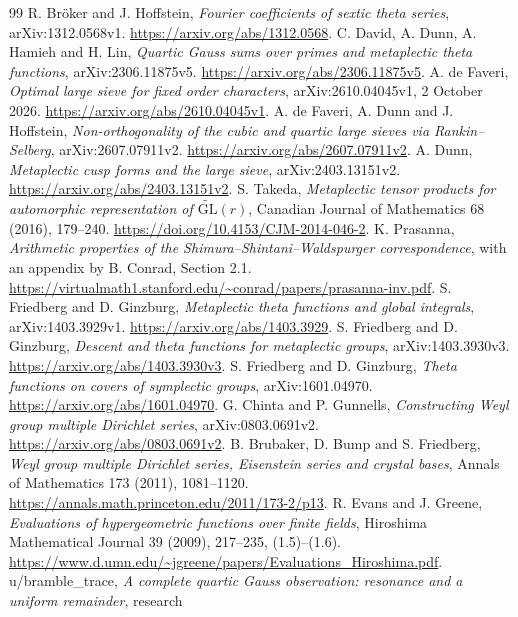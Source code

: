 \documentclass[11pt]{article}
\begin{document}
\begin{thebibliography}{99}
 R. Br\"oker and J. Hoffstein,
\emph{Fourier coefficients of sextic theta series}, arXiv:1312.0568v1.
\url{https://arxiv.org/abs/1312.0568}.
 C. David, A. Dunn, A. Hamieh and H. Lin,
\emph{Quartic Gauss sums over primes and metaplectic theta functions},
arXiv:2306.11875v5.
\url{https://arxiv.org/abs/2306.11875v5}.
 A. de Faveri, \emph{Optimal large sieve for fixed order
characters}, arXiv:2610.04045v1, 2 October 2026.
\url{https://arxiv.org/abs/2610.04045v1}.
 A. de Faveri, A. Dunn and J. Hoffstein,
\emph{Non-orthogonality of the cubic and quartic large sieves via
Rankin--Selberg}, arXiv:2607.07911v2.
\url{https://arxiv.org/abs/2607.07911v2}.
 A. Dunn, \emph{Metaplectic cusp forms and the large
sieve}, arXiv:2403.13151v2.
\url{https://arxiv.org/abs/2403.13151v2}.
 S. Takeda, \emph{Metaplectic tensor products for
automorphic representation of $\widetilde{\mathrm{GL}}(r)$},
Canadian Journal of Mathematics 68 (2016), 179--240.
\url{https://doi.org/10.4153/CJM-2014-046-2}.
 K. Prasanna, \emph{Arithmetic properties of the
Shimura--Shintani--Waldspurger correspondence}, with an appendix by
B. Conrad, Section 2.1.
\url{https://virtualmath1.stanford.edu/~conrad/papers/prasanna-inv.pdf}.
 S. Friedberg and D. Ginzburg, \emph{Metaplectic theta
functions and global integrals}, arXiv:1403.3929v1.
\url{https://arxiv.org/abs/1403.3929}.
 S. Friedberg and D. Ginzburg, \emph{Descent and theta
functions for metaplectic groups}, arXiv:1403.3930v3.
\url{https://arxiv.org/abs/1403.3930v3}.
 S. Friedberg and D. Ginzburg, \emph{Theta functions
on covers of symplectic groups}, arXiv:1601.04970.
\url{https://arxiv.org/abs/1601.04970}.
 G. Chinta and P. Gunnells, \emph{Constructing Weyl group
multiple Dirichlet series}, arXiv:0803.0691v2.
\url{https://arxiv.org/abs/0803.0691v2}.
 B. Brubaker, D. Bump and S. Friedberg,
\emph{Weyl group multiple Dirichlet series, Eisenstein series and crystal
bases}, Annals of Mathematics 173 (2011), 1081--1120.
\url{https://annals.math.princeton.edu/2011/173-2/p13}.
 R. Evans and J. Greene,
\emph{Evaluations of hypergeometric functions over finite fields},
Hiroshima Mathematical Journal 39 (2009), 217--235, (1.5)--(1.6).
\url{https://www.d.umn.edu/~jgreene/papers/Evaluations_Hiroshima.pdf}.
 u/bramble\_trace, \emph{A complete quartic
Gauss observation: resonance and a uniform remainder}, research

\end{thebibliography}
\end{document}

